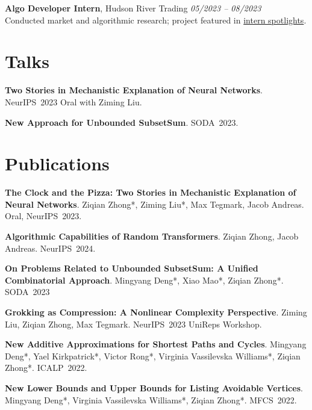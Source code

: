 \documentclass[11pt,letterpaper]{article}
\newcommand{\daterange}[3][]{%
  \hfill \textit{#2 -- #3} \vspace{1mm}
}
\begin{document}
\vspace{4pt}
\textbf{Algo Developer Intern}, Hudson River Trading \daterange[New York,~NY]{05/2023}{08/2023}\\
Conducted market and algorithmic research; project featured in \href{https://www.hudsonrivertrading.com/hrtbeat/intern-spotlight-2023-hrt-ai-labs-summer-projects/}{intern spotlights}.

\section*{Talks}
\begin{outerlist}
\item \textbf{Two Stories in Mechanistic Explanation of Neural Networks}. NeurIPS~2023 Oral with Ziming Liu.
\item \textbf{New Approach for Unbounded SubsetSum}. SODA~2023.
\end{outerlist}

\section*{Publications}
\begin{outerlist}
\item \textbf{The Clock and the Pizza: Two Stories in Mechanistic Explanation of Neural Networks}. Ziqian Zhong*, Ziming Liu*, Max Tegmark, Jacob Andreas. Oral, NeurIPS~2023.
\item \textbf{Algorithmic Capabilities of Random Transformers}. Ziqian Zhong, Jacob Andreas. NeurIPS~2024.
\item \textbf{On Problems Related to Unbounded SubsetSum: A Unified Combinatorial Approach}. Mingyang Deng*, Xiao Mao*, Ziqian Zhong*. SODA~2023
\item \textbf{Grokking as Compression: A Nonlinear Complexity Perspective}. Ziming Liu, Ziqian Zhong, Max Tegmark. NeurIPS~2023 UniReps Workshop.
\item \textbf{New Additive Approximations for Shortest Paths and Cycles}. Mingyang Deng*, Yael Kirkpatrick*, Victor Rong*, Virginia Vassilevska Williams*, Ziqian Zhong*. ICALP~2022.
\item \textbf{New Lower Bounds and Upper Bounds for Listing Avoidable Vertices}. Mingyang Deng*, Virginia Vassilevska Williams*, Ziqian Zhong*. MFCS~2022.
\end{outerlist}
\end{document}
